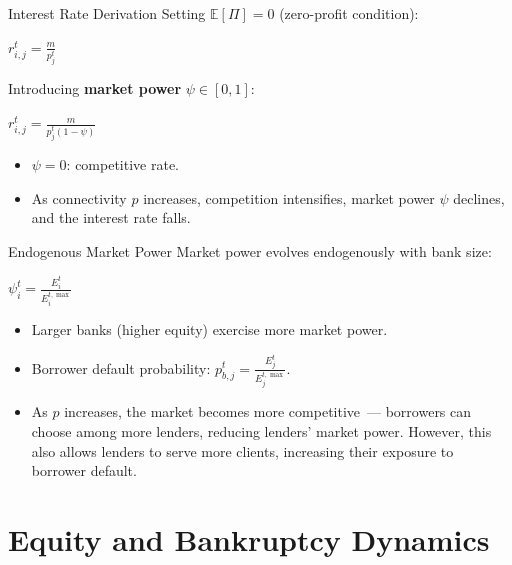 \begin{frame}{Interest Rate Derivation}
  Setting $\mathbb{E}[\Pi] = 0$ (zero-profit condition):
  \begin{block}{}
    \centering
     $r_{i,j}^t = \frac{m}{p_j^t}$
  \end{block}
  
  Introducing \textbf{market power} $\psi \in [0,1]$:
  \begin{block}{}
    \centering
    $ r_{i,j}^t = \frac{m}{p_j^t (1 - \psi)} $
  \end{block}
  \begin{itemize}
    \item $\psi = 0$: competitive rate.
    \item As connectivity $p$ increases, competition intensifies, market power $\psi$ declines, and the interest rate falls.
  \end{itemize}
\end{frame}


\begin{frame}{Endogenous Market Power}
  Market power evolves endogenously with bank size:
  \begin{block}{}
    \centering
    $ \psi_i^t = \frac{E_i^t}{E_i^{t,\max}} $
  \end{block}
  \begin{itemize}
    \item Larger banks (higher equity) exercise more market power.
    \item Borrower default probability:
    $p_{b,j}^t = \frac{E_j^t}{E_j^{t,\max}} $.
    \item As $p$ increases, the market becomes more competitive\ --- borrowers can choose among more lenders, reducing lenders' market power. However, this also allows lenders to serve more clients, increasing their exposure to borrower default.
  \end{itemize}
\end{frame}



\section{Equity and Bankruptcy Dynamics}\label{sec:5}

